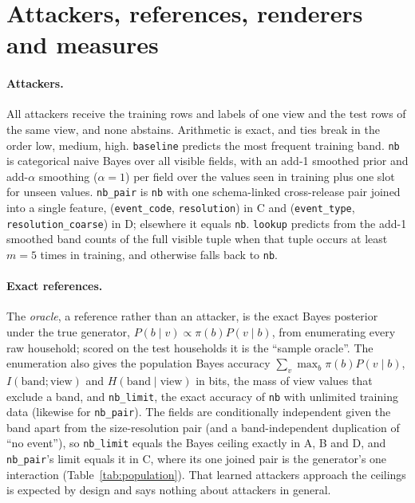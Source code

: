 \documentclass[11pt]{article}
\newcommand{\code}[1]{\texttt{#1}}
\begin{document}
\section{Attackers, references, renderers and measures}
\label{sec:method}

\paragraph{Attackers.} All attackers receive the training rows and labels of one view and the test rows of the same view, and none abstains. Arithmetic is exact, and ties break in the order low, medium, high. \code{baseline} predicts the most frequent training band. \code{nb} is categorical naive Bayes over all visible fields, with an add-1 smoothed prior and add-$\alpha$ smoothing ($\alpha = 1$) per field over the values seen in training plus one slot for unseen values. \code{nb\_pair} is \code{nb} with one schema-linked cross-release pair joined into a single feature, (\code{event\_code}, \code{resolution}) in C and (\code{event\_type}, \code{resolution\_coarse}) in D; elsewhere it equals \code{nb}. \code{lookup} predicts from the add-1 smoothed band counts of the full visible tuple when that tuple occurs at least $m = 5$ times in training, and otherwise falls back to \code{nb}.

\paragraph{Exact references.} The \emph{oracle}, a reference rather than an attacker, is the exact Bayes posterior under the true generator, $P(b \mid v) \propto \pi(b) P(v \mid b)$, from enumerating every raw household; scored on the test households it is the ``sample oracle''. The enumeration also gives the population Bayes accuracy $\sum_v \max_b \pi(b) P(v \mid b)$, $I(\text{band}; \text{view})$ and $H(\text{band} \mid \text{view})$ in bits, the mass of view values that exclude a band, and \code{nb\_limit}, the exact accuracy of \code{nb} with unlimited training data (likewise for \code{nb\_pair}). The fields are conditionally independent given the band apart from the size-resolution pair (and a band-independent duplication of ``no event''), so \code{nb\_limit} equals the Bayes ceiling exactly in A, B and D, and \code{nb\_pair}'s limit equals it in C, where its one joined pair is the generator's one interaction (Table~\ref{tab:population}). That learned attackers approach the ceilings is expected by design and says nothing about attackers in general.
\end{document}
